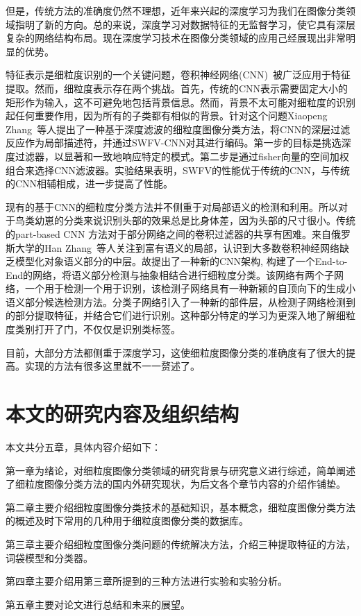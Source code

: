 但是，传统方法的准确度仍然不理想，近年来兴起的深度学习为我们在图像分类领域指明了新的方向。总的来说，深度学习对数据特征的无监督学习，使它具有深层复杂的网络结构布局。现在深度学习技术在图像分类领域的应用己经展现出非常明显的优势。

特征表示是细粒度识别的一个关键问题，卷积神经网络(CNN)~\cite{sharif2014cnn}被广泛应用于特征提取。然而，细粒度表示存在两个挑战。首先，传统的CNN表示需要固定大小的矩形作为输入，这不可避免地包括背景信息。然而，背景不太可能对细粒度的识别起任何重要作用，因为所有的子类都有相似的背景。针对这个问题Xiaopeng Zhang~\cite{zhang2016picking}等人提出了一种基于深度滤波的细粒度图像分类方法，将CNN的深层过滤反应作为局部描述符，并通过SWFV-CNN对其进行编码。第一步的目标是挑选深度过滤器，以显著和一致地响应特定的模式。第二步是通过fisher向量的空间加权组合来选择CNN滤波器。实验结果表明，SWFV的性能优于传统的CNN，与传统的CNN相辅相成，进一步提高了性能。

现有的基于CNN的细粒度分类方法并不侧重于对局部语义的检测和利用。所以对于鸟类幼崽的分类来说识别头部的效果总是比身体差，因为头部的尺寸很小。传统的part-based CNN 方法对于部分网络之间的卷积过滤器的共享有困难。来自俄罗斯大学的Han Zhang~\cite{zhang2016spda}等人关注到富有语义的局部，认识到大多数卷积神经网络缺乏模型化对象语义部分的中层。故提出了一种新的CNN架构, 构建了一个End-to-End的网络，将语义部分检测与抽象相结合进行细粒度分类。该网络有两个子网络，一个用于检测一个用于识别，该检测子网络具有一种新颖的自顶向下的生成小语义部分候选检测方法。分类子网络引入了一种新的部件层，从检测子网络检测到的部分提取特征，并结合它们进行识别。这种部分特定的学习为更深入地了解细粒度类别打开了门，不仅仅是识别类标签。

目前，大部分方法都侧重于深度学习，这使细粒度图像分类的准确度有了很大的提高。实现的方法有很多这里就不一一赘述了。
\section{本文的研究内容及组织结构}
\label{sec:jiegou} 
本文共分五章，具体内容介绍如下：

第一章为绪论，对细粒度图像分类领域的研究背景与研究意义进行综述，简单阐述了细粒度图像分类方法的国内外研究现状，为后文各个章节内容的介绍作铺垫。

第二章主要介绍细粒度图像分类技术的基础知识，基本概念，细粒度图像分类方法的概述及时下常用的几种用于细粒度图像分类的数据库。

第三章主要介绍细粒度图像分类问题的传统解决方法，介绍三种提取特征的方法，词袋模型和分类器。

第四章主要介绍用第三章所提到的三种方法进行实验和实验分析。

第五章主要对论文进行总结和未来的展望。
